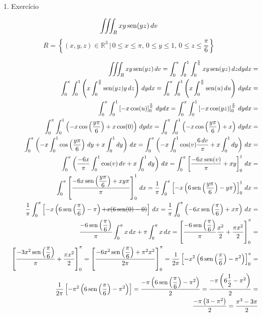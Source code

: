 \begin{enumerate}
	\item Exercício
	
	\begin{equation*}
		\iiint_R xy\operatorname{sen}(yz)\, dv
	\end{equation*}
	\begin{equation*}
		R = \left\{(x, y, z) \in \mathbb{R}^3 \,|\, 0 \leq x \leq \pi,\, 0 \leq y \leq 1,\, 0 \leq z \leq \dfrac{\pi}{6}\right\}
	\end{equation*}
	
	\begin{align*}
		\iiint_R xy\sen(yz)\, dv = \int_0^{\pi} \int_0^1 \int_0^{\frac{\pi}{6}} xy\sen(yz)\, dzdydx =\\  \int_0^{\pi} \int_0^1\left(x\int_0^{\frac{\pi}{6}} \sen(yz)y\, dz\right)\, dydx = \int_0^{\pi} \int_0^1\left(x\int_0^{\frac{\pi}{6}} \sen(u)\, du\right)\, dydx =\\ \int_0^{\pi} \int_0^1 \left[-x\cos(u)\right]_0^{\frac{\pi}{6}}\, dydx = \int_0^{\pi} \int_0^1 \left[-x\cos(yz)\right]_0^{\frac{\pi}{6}}\, dydx =\\ \int_0^{\pi} \int_0^1 \left(-x\cos\left(\dfrac{y\pi}{6}\right) + x\cos(0)\right)\, dydx = \int_0^{\pi} \int_0^1 \left(-x\cos\left(\dfrac{y\pi}{6}\right) + x\right)\, dydx =\\ \int_0^{\pi}\left(-x\int_0^1\cos\left(\dfrac{y\pi}{6}\right)\, dy + x\int_0^1 dy \right)\, dx = \int_0^{\pi}\left(-x\int_0^1\cos(v)\dfrac{6\, dv}{\pi} + x\int_0^1 dy \right)\, dx =\\ \int_0^{\pi}\left(\dfrac{-6x}{\pi}\int_0^1\cos(v)\, dv + x\int_0^1 dy \right)\, dx = \int_0^{\pi}\left[\dfrac{-6x\sen(v)}{\pi} + xy\right]_0^1\, dx =\\ \int_0^{\pi}\left[\dfrac{-6x\sen\left(\dfrac{y\pi}{6}\right) + xy\pi}{\pi}\right]_0^1\, dx = \dfrac{1}{\pi}\int_0^{\pi}\left[-x\left(6\sen\left(\dfrac{y\pi}{6}\right) - y\pi\right)\right]_0^1\, dx =\\ \dfrac{1}{\pi}\int_0^{\pi}\left[-x\left(6\sen\left(\dfrac{\pi}{6}\right) - \pi\right) \overstrike{+ x(6\sen(0) - 0)}\right]\, dx = \dfrac{1}{\pi}\int_0^{\pi}\left(-6x\sen\left(\dfrac{\pi}{6}\right) + x\pi\right)\, dx =\\ \dfrac{-6\sen\left(\dfrac{\pi}{6}\right)}{\pi}\int_0^{\pi} x\, dx + \pi\int_0^{\pi} x\, dx = \left[\dfrac{-6\sen\left(\dfrac{\pi}{6}\right)}{\pi}\dfrac{x^2}{2} + \dfrac{\pi x^2}{2}\right]_0^{\pi} =\\ \left[\dfrac{-3x^2\sen\left(\dfrac{\pi}{6}\right)}{\pi} + \dfrac{\pi x^2}{2}\right]_0^{\pi} = \left[\dfrac{-6x^2\sen\left(\dfrac{\pi}{6}\right) + \pi^2 x^2}{2\pi}\right]_0^{\pi} = \dfrac{1}{2\pi}\left[-x^2\left(6\sen\left(\dfrac{\pi}{6}\right) - \pi^2\right)\right]_0^{\pi} =\\ \dfrac{1}{2\pi}\left[-\pi^2\left(6\sen\left(\dfrac{\pi}{6}\right) - \pi^2\right)\right] = \dfrac{-\pi\left(6\sen\left(\dfrac{\pi}{6}\right) - \pi^2\right)}{2} = \dfrac{-\pi\left(6\dfrac{1}{2} - \pi^2\right)}{2} =\\ \dfrac{-\pi\left(3 - \pi^2\right)}{2} = \dfrac{\pi^3 - 3\pi}{2}

\end{align*}
\end{enumerate}
